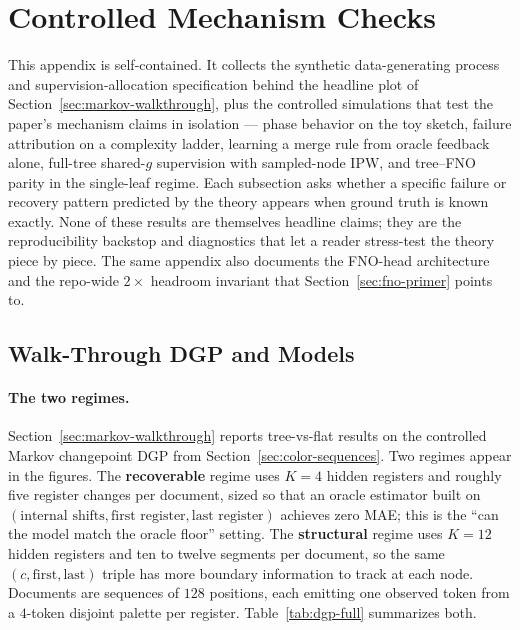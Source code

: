 \section{Controlled Mechanism Checks}\label{app:mechanism-checks}

This appendix is self-contained. It collects the synthetic
data-generating process and supervision-allocation specification
behind the headline plot of Section~\ref{sec:markov-walkthrough},
plus the controlled simulations that test the paper's mechanism
claims in isolation --- phase behavior on the toy sketch, failure
attribution on a complexity ladder, learning a merge rule from oracle
feedback alone, full-tree shared-$g$ supervision with sampled-node
IPW, and tree--FNO parity in the single-leaf regime. Each subsection
asks whether a specific failure or recovery pattern predicted by the
theory appears when ground truth is known exactly. None of these
results are themselves headline claims; they are the reproducibility
backstop and diagnostics that let a reader stress-test the theory
piece by piece. The same appendix also documents the FNO-head
architecture and the repo-wide $2\times$ headroom invariant that
Section~\ref{sec:fno-primer} points to.

\subsection{Walk-Through DGP and Models}\label{app:walkthrough-dgp}

\paragraph{The two regimes.}
Section~\ref{sec:markov-walkthrough} reports tree-vs-flat results on
the controlled Markov changepoint DGP from
Section~\ref{sec:color-sequences}. Two regimes appear in the
figures. The \textbf{recoverable} regime uses $K=4$ hidden registers
and roughly five register changes per document, sized so that an
oracle estimator built on $(\text{internal shifts}, \text{first
register}, \text{last register})$ achieves zero MAE; this is the
``can the model match the oracle floor'' setting. The
\textbf{structural} regime uses $K=12$ hidden registers and ten to
twelve segments per document, so the same $(c, \text{first},
\text{last})$ triple has more boundary information to track at each
node. Documents are sequences of $128$ positions, each emitting one
observed token from a $4$-token disjoint palette per register.
Table~\ref{tab:dgp-full} summarizes both.

